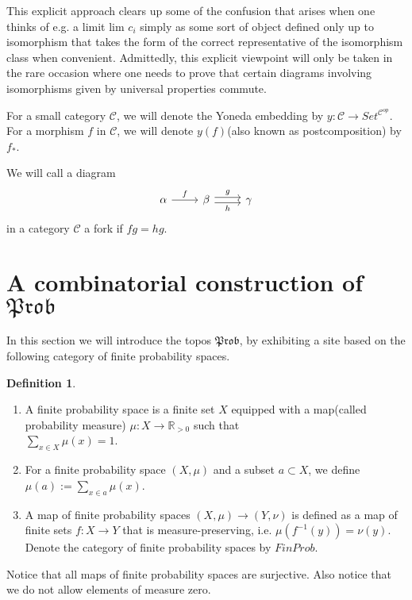 \documentclass[a4paper]{amsproc}
\theoremstyle{plain}
\theoremstyle{definition}
\newtheorem{definition}[theorem]{Definition}
\theoremstyle{remark}
\numberwithin{equation}{section}
\begin{document}
This explicit approach clears up some of the confusion that arises when one thinks of e.g. a limit $\text{lim } c_i$ simply as some sort of object defined only up to isomorphism that takes the form of the correct representative of the isomorphism class when convenient. Admittedly, this explicit viewpoint will only be taken in the rare occasion where one needs to prove that certain diagrams involving isomorphisms given by universal properties commute.

For a small category $\mathcal{C}$, we will denote the Yoneda embedding by $y: \mathcal{C} \to Set^{\mathcal{C}^{op}}$. For a morphism $f$ in $\mathcal{C}$, we will denote $y(f)$(also known as postcomposition) by $f_*$.

We will call a diagram
\[
\begin{tikzcd}
\alpha \arrow[r, "f"] & \beta \arrow[r, "g", shift left] \arrow[r, "h"', shift right] & \gamma
\end{tikzcd}
\]
in a category $\mathcal{C}$ a fork if $fg = hg$.

\section{A combinatorial construction of $\mathfrak{Prob}$}

In this section we will introduce the topos $\mathfrak{Prob}$, by exhibiting a site based on the following category of finite probability spaces.

\begin{definition}
\begin{enumerate}
\item A finite probability space is a finite set $X$ equipped with a map(called probability measure) $\mu: X \to \mathbb{R}_{>0}$ such that \\ $\sum_{x \in X} \mu(x) = 1$.
\item For a finite probability space $(X,\mu)$ and a subset $a \subset X$, we define $\mu(a) := \sum_{x \in a} \mu(x)$.
\item A map of finite probability spaces $(X,\mu) \to (Y,\nu)$ is defined as a map of finite sets $f: X \to Y$ that is measure-preserving, i.e. $\mu(f^{-1}(y)) = \nu(y)$. Denote the category of finite probability spaces by $FinProb$.
\end{enumerate}
\end{definition}

Notice that all maps of finite probability spaces are surjective. Also notice that we do not allow elements of measure zero.
\end{document}

